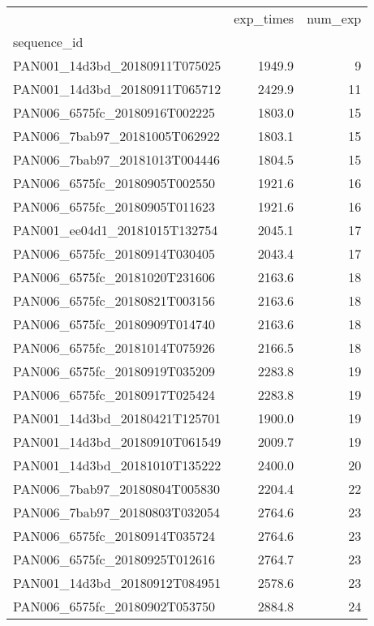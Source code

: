 \begin{tabular}{lrr}
\toprule
{} &  exp\_times &  num\_exp \\
sequence\_id                   &            &          \\
\midrule
PAN001\_14d3bd\_20180911T075025 &     1949.9 &        9 \\
PAN001\_14d3bd\_20180911T065712 &     2429.9 &       11 \\
PAN006\_6575fc\_20180916T002225 &     1803.0 &       15 \\
PAN006\_7bab97\_20181005T062922 &     1803.1 &       15 \\
PAN006\_7bab97\_20181013T004446 &     1804.5 &       15 \\
PAN006\_6575fc\_20180905T002550 &     1921.6 &       16 \\
PAN006\_6575fc\_20180905T011623 &     1921.6 &       16 \\
PAN001\_ee04d1\_20181015T132754 &     2045.1 &       17 \\
PAN006\_6575fc\_20180914T030405 &     2043.4 &       17 \\
PAN006\_6575fc\_20181020T231606 &     2163.6 &       18 \\
PAN006\_6575fc\_20180821T003156 &     2163.6 &       18 \\
PAN006\_6575fc\_20180909T014740 &     2163.6 &       18 \\
PAN006\_6575fc\_20181014T075926 &     2166.5 &       18 \\
PAN006\_6575fc\_20180919T035209 &     2283.8 &       19 \\
PAN006\_6575fc\_20180917T025424 &     2283.8 &       19 \\
PAN001\_14d3bd\_20180421T125701 &     1900.0 &       19 \\
PAN001\_14d3bd\_20180910T061549 &     2009.7 &       19 \\
PAN001\_14d3bd\_20181010T135222 &     2400.0 &       20 \\
PAN006\_7bab97\_20180804T005830 &     2204.4 &       22 \\
PAN006\_7bab97\_20180803T032054 &     2764.6 &       23 \\
PAN006\_6575fc\_20180914T035724 &     2764.6 &       23 \\
PAN006\_6575fc\_20180925T012616 &     2764.7 &       23 \\
PAN001\_14d3bd\_20180912T084951 &     2578.6 &       23 \\
PAN006\_6575fc\_20180902T053750 &     2884.8 &       24 \\

\end{tabular}
